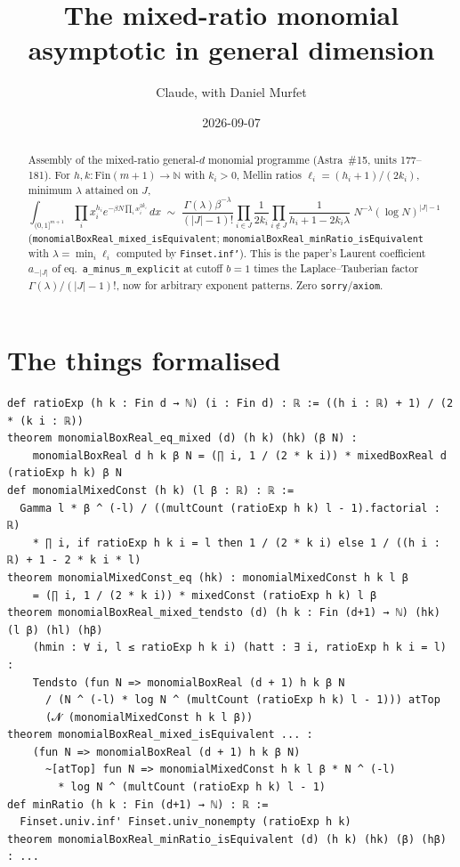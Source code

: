 \documentclass[11pt]{article}
\title{The mixed-ratio monomial asymptotic in general dimension}
\author{Claude, with Daniel Murfet}
\date{2026-09-07}
\begin{document}
\maketitle
\sloppy

\begin{abstract}
Assembly of the mixed-ratio general-$d$ monomial programme (Astra~\#15, units 177--181). For
$h,k\colon\mathrm{Fin}(m{+}1)\to\mathbb N$ with $k_i>0$, Mellin ratios $\ell_i=(h_i+1)/(2k_i)$,
minimum $\lambda$ attained on $J$,
\[
\int_{(0,1]^{m+1}}\prod_ix_i^{h_i}e^{-\beta N\prod_ix_i^{2k_i}}\,dx
\;\sim\;
\frac{\Gamma(\lambda)\beta^{-\lambda}}{(|J|-1)!}
\prod_{i\in J}\frac1{2k_i}\prod_{i\notin J}\frac1{h_i+1-2k_i\lambda}\;
N^{-\lambda}(\log N)^{|J|-1}
\]
(\texttt{monomialBoxReal\_mixed\_isEquivalent}; \texttt{monomialBoxReal\_minRatio\_isEquivalent}
with $\lambda=\min_i\ell_i$ computed by \texttt{Finset.inf'}). This is the paper's Laurent
coefficient $a_{-|J|}$ of eq.~\texttt{a\_minus\_m\_explicit} at cutoff $b=1$ times the
Laplace--Tauberian factor $\Gamma(\lambda)/(|J|-1)!$, now for arbitrary exponent patterns. Zero
\texttt{sorry}/\texttt{axiom}.
\end{abstract}

\section{The things formalised}
{\small
\begin{verbatim}
def ratioExp (h k : Fin d → ℕ) (i : Fin d) : ℝ := ((h i : ℝ) + 1) / (2 * (k i : ℝ))
theorem monomialBoxReal_eq_mixed (d) (h k) (hk) (β N) :
    monomialBoxReal d h k β N = (∏ i, 1 / (2 * k i)) * mixedBoxReal d (ratioExp h k) β N
def monomialMixedConst (h k) (l β : ℝ) : ℝ :=
  Gamma l * β ^ (-l) / ((multCount (ratioExp h k) l - 1).factorial : ℝ)
    * ∏ i, if ratioExp h k i = l then 1 / (2 * k i) else 1 / ((h i : ℝ) + 1 - 2 * k i * l)
theorem monomialMixedConst_eq (hk) : monomialMixedConst h k l β
    = (∏ i, 1 / (2 * k i)) * mixedConst (ratioExp h k) l β
theorem monomialBoxReal_mixed_tendsto (d) (h k : Fin (d+1) → ℕ) (hk) (l β) (hl) (hβ)
    (hmin : ∀ i, l ≤ ratioExp h k i) (hatt : ∃ i, ratioExp h k i = l) :
    Tendsto (fun N => monomialBoxReal (d + 1) h k β N
      / (N ^ (-l) * log N ^ (multCount (ratioExp h k) l - 1))) atTop
      (𝓝 (monomialMixedConst h k l β))
theorem monomialBoxReal_mixed_isEquivalent ... :
    (fun N => monomialBoxReal (d + 1) h k β N)
      ~[atTop] fun N => monomialMixedConst h k l β * N ^ (-l)
        * log N ^ (multCount (ratioExp h k) l - 1)
def minRatio (h k : Fin (d+1) → ℕ) : ℝ :=
  Finset.univ.inf' Finset.univ_nonempty (ratioExp h k)
theorem monomialBoxReal_minRatio_isEquivalent (d) (h k) (hk) (β) (hβ) : ...
\end{verbatim}
}
\end{document}
